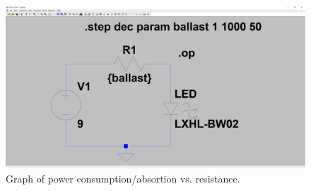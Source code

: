 \documentclass[10pt]{article}
\begin{document}
\begin{figure}[H]
	\centering
		\includegraphics[width=5in]{Capture8}
	\caption{Graph of power consumption/absortion vs. resistance.}
\end{figure}
\end{document}
